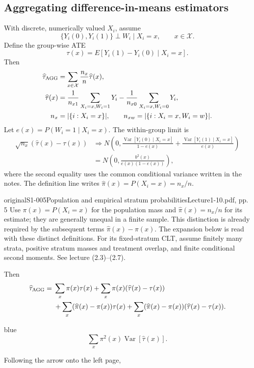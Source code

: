 \subsection{Aggregating difference-in-means estimators}
 With discrete, numerically valued $X_i$, assume
\[
\{Y_i(0),Y_i(1)\}\perp W_i\mid X_i=x,\qquad x\in\mathcal X.
\]
 Define the group-wise ATE
\[
\tau(x)=E[Y_i(1)-Y_i(0)\mid X_i=x].
\]
Then
\begin{align*}
\widehat\tau_{\rm AGG}&=\sum_{x\in\mathcal X}\frac{n_x}{n}\widehat\tau(x),\\
\widehat\tau(x)&=\frac1{n_{x1}}\sum_{X_i=x,W_i=1}Y_i
-\frac1{n_{x0}}\sum_{X_i=x,W_i=0}Y_i,\\
n_x&=|\{i:X_i=x\}|,\qquad
n_{xw}=|\{i:X_i=x,W_i=w\}|.
\end{align*}
Let $e(x)=P(W_i=1\mid X_i=x)$. The within-group limit is
\begin{align*}
\sqrt{n_x}(\widehat\tau(x)-\tau(x))
&\Rightarrow N\left(0,
\frac{\operatorname{Var}[Y_i(0)\mid X_i=x]}{1-e(x)}
+\frac{\operatorname{Var}[Y_i(1)\mid X_i=x]}{e(x)}\right)\\
&=N\left(0,\frac{b^2(x)}{e(x)(1-e(x))}\right),
\end{align*}
where the second equality uses the common conditional variance written in the notes. The definition line writes $\widehat\pi(x)=P(X_i=x)=n_x/n$.
\begin{reviewnote}{original}{S1-005}{Population and empirical stratum probabilities}{Lecture1-10.pdf, pp. 5}
Use $\pi(x)=P(X_i=x)$ for the population mass and $\widehat\pi(x)=n_x/n$ for its estimate; they are generally unequal in a finite sample. This distinction is already required by the subsequent terms $\widehat\pi(x)-\pi(x)$. The expansion below is read with these distinct definitions. For its fixed-stratum CLT, assume finitely many strata, positive stratum masses and treatment overlap, and finite conditional second moments. See lecture (2.3)--(2.7).
\end{reviewnote}
 Then
\begin{align*}
\widehat\tau_{\rm AGG}={}&\sum_x\pi(x)\tau(x)
+\sum_x\pi(x)(\widehat\tau(x)-\tau(x))\\
&+\sum_x(\widehat\pi(x)-\pi(x))\tau(x)
+\sum_x(\widehat\pi(x)-\pi(x))(\widehat\tau(x)-\tau(x)).
\end{align*}
 
\begin{inkblock}{blue}
\[
\sum_x\pi^2(x)\operatorname{Var}[\widehat\tau(x)].
\]
\end{inkblock}
 Following the arrow onto the left page,

